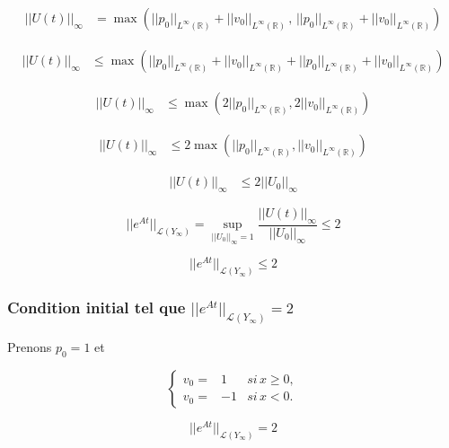\documentclass[a4paper,11pt]{article}
\begin{document}
\begin{displaymath}
    \begin{split}
        ||U(t)||_{\infty} &= \max \left( ||p_0||_{L^{\infty}(\mathbb{R})} + ||v_0||_{L^{\infty}(\mathbb{R})} \, , \,
        ||p_0||_{L^{\infty}(\mathbb{R})} + ||v_0||_{L^{\infty}(\mathbb{R})} \right)
    \end{split}
\end{displaymath}

\begin{displaymath}
    \begin{split}
        ||U(t)||_{\infty} & \le \max \left( ||p_0||_{L^{\infty}(\mathbb{R})} + ||v_0||_{L^{\infty}(\mathbb{R})} + ||p_0||_{L^{\infty}(\mathbb{R})} + ||v_0||_{L^{\infty}(\mathbb{R})} \right)
    \end{split}
\end{displaymath}

\begin{displaymath}
    \begin{split}
        ||U(t)||_{\infty} & \le \max \left(2 ||p_0||_{L^{\infty}(\mathbb{R})}, 2||v_0||_{L^{\infty}(\mathbb{R})} \right)
    \end{split}
\end{displaymath}

\begin{displaymath}
    \begin{split}
        ||U(t)||_{\infty} & \le 2 \max \left(||p_0||_{L^{\infty}(\mathbb{R})}, ||v_0||_{L^{\infty}(\mathbb{R})} \right)
    \end{split}
\end{displaymath}

\begin{displaymath}
    \begin{split}
        ||U(t)||_{\infty} & \le 2 ||U_0||_{\infty}
    \end{split}
\end{displaymath}

\begin{equation*}
||e^{At}||_{\mathcal{L}(Y_{\infty})} = \sup_{||U_{0}||_{\infty} = 1}\frac{||U(t)||_{\infty}}{||U_{0}||_{\infty}}  \le 2
\end{equation*}

\begin{equation*}
    ||e^{At}||_{\mathcal{L}(Y_{\infty})} \le 2
\end{equation*}

\subsubsection*{Condition initial tel que \( ||e^{At}||_{\mathcal{L}(Y_{\infty})} = 2\) }

Prenons \( p_{0} = 1 \) et 

\begin{equation*}
    \left\{
    \begin{array}{rcl}
        v_{0} = & 1 & si \, x \ge 0, \\
        v_{0} = & -1 & si \,  x < 0.
    \end{array}
    \right.
\end{equation*}


\begin{equation*}
    ||e^{At}||_{\mathcal{L}(Y_{\infty})} = 2
\end{equation*}
\end{document}
